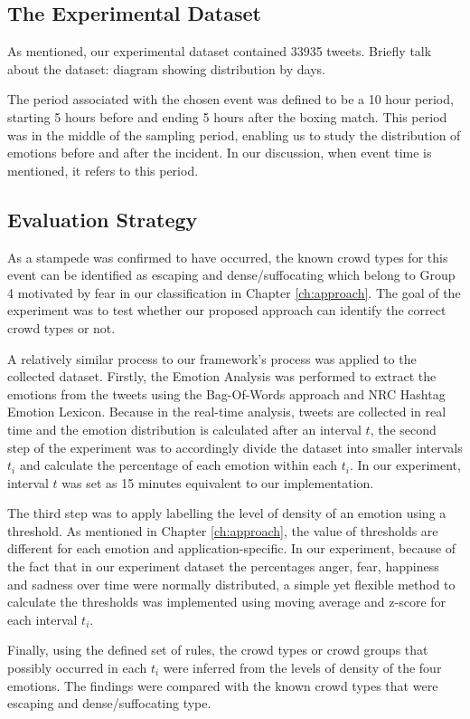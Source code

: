 \subsection{The Experimental Dataset}
As mentioned, our experimental dataset contained 33935 tweets. Briefly talk about the dataset: diagram showing distribution by days.

The period associated with the chosen event was defined to be a 10 hour period, starting 5 hours before and ending 5 hours after the boxing match. This period was in the middle of the sampling period, enabling us to study the distribution of emotions before and after the incident. In our discussion, when event time is mentioned, it refers to this period.

\subsection{Evaluation Strategy}
As a stampede was confirmed to have occurred, the known crowd types for this event can be identified as escaping and dense/suffocating which belong to Group 4 motivated by fear in our classification in Chapter \ref{ch:approach}. The goal of the experiment was to test whether our proposed approach can identify the correct crowd types or not.

A relatively similar process to our framework's process was applied to the collected dataset. Firstly, the Emotion Analysis was performed to extract the emotions from the tweets using the Bag-Of-Words approach and NRC Hashtag Emotion Lexicon. Because in the real-time analysis, tweets are collected in real time and the emotion distribution is calculated after an interval \(t\), the second step of the experiment was to accordingly divide the dataset into smaller intervals \(t_i\) and calculate the percentage of each emotion within each \(t_i\). In our experiment, interval \(t\) was set as 15 minutes equivalent to our implementation.

The third step was to apply labelling the level of density of an emotion using a threshold. As mentioned in Chapter \ref{ch:approach}, the value of thresholds are different for each emotion and application-specific. In our experiment, because of the fact that in our experiment dataset the percentages anger, fear, happiness and sadness over time were normally distributed, a simple yet flexible method to calculate the thresholds was implemented using moving average and z-score for each interval \(t_i\).

Finally, using the defined set of rules, the crowd types or crowd groups that possibly occurred in each \(t_i\) were inferred from the levels of density of the four emotions. The findings were compared with the known crowd types that were escaping and dense/suffocating type.

